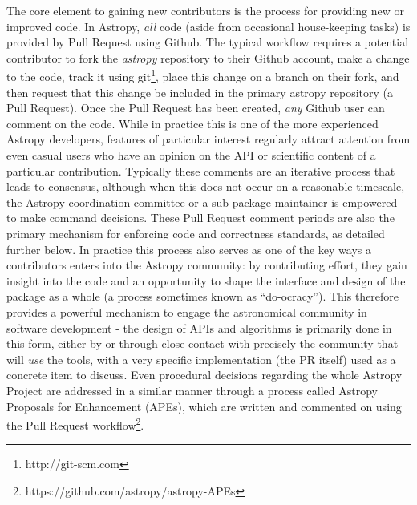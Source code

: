 \documentclass[11pt,twoside]{article}
\newcommand{\astropypkg}{\textit{astropy}}
\begin{document}
The core element to gaining new contributors is the process for providing new or improved code.
In Astropy, \emph{all} code (aside from occasional house-keeping tasks) is provided by Pull Request using Github.
The typical workflow requires a potential contributor to fork the \astropypkg{} repository to their Github account, make a change to the code, track it using git\footnote{http://git-scm.com}, place this change on a branch on their fork, and then request that this change be included in the primary astropy repository (a Pull Request).
Once the Pull Request has been created, \emph{any} Github user can comment on the code.
While in practice this is one of the more experienced Astropy developers, features of particular interest regularly attract attention from even casual users who have an opinion on the API or scientific content of a particular contribution.
Typically these comments are an iterative process that leads to consensus, although when this does not occur on a reasonable timescale, the Astropy coordination committee or a sub-package maintainer is empowered to make command decisions.
These Pull Request comment periods are also the primary mechanism for enforcing code and correctness standards, as detailed further below.
In practice this process also serves as one of the key ways a contributors enters into the Astropy community: by contributing effort, they gain insight into the code and an opportunity to shape the interface and design of the package as a whole (a process sometimes known as ``do-ocracy'').
This therefore provides a powerful mechanism to engage the astronomical community in software development - the design of APIs and algorithms is primarily done in this form, either by or through close contact with precisely the community that will \emph{use} the tools, with a very specific implementation (the PR itself) used as a concrete item to discuss.
Even procedural decisions regarding the whole Astropy Project are addressed in a similar manner through a process called Astropy Proposals for Enhancement (APEs), which are written and commented on using the Pull Request workflow\footnote{https://github.com/astropy/astropy-APEs}.
\end{document}
